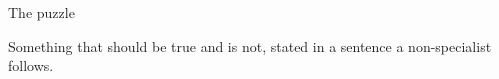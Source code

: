\begin{frame}{The puzzle}
  \begin{pullquote}
  Something that should be true and is not, stated in a sentence a non-specialist follows.
  \end{pullquote}
\end{frame}

